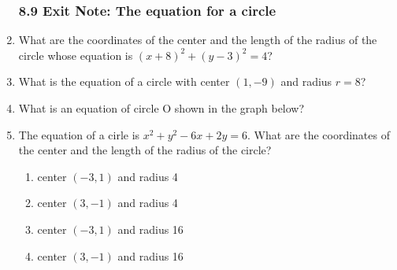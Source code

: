 \documentclass[12pt, twoside]{article}
\begin{document}
\begin{enumerate}
\newpage
\subsubsection*{8.9 Exit Note: The equation for a circle}
\item What are the coordinates of the center and the length of the radius of the circle whose equation is $(x+8)^2+(y-3)^2=4$? \vspace{1.5cm}

\item What is the equation of a circle with center $(1,-9)$ and radius $r=8$?\vspace{1.5cm}
  
\item What is an equation of circle O shown in the graph below?
  \begin{center}
  \end{center} \vspace{2cm}

\item %
The equation of a cirle is $x^2+y^2-6x+2y=6$. What are the coordinates of the center and the length of the radius of the circle?
  \begin{enumerate}
    \item center $(-3,1)$ and radius 4
    \item center $(3,-1)$ and radius 4
    \item center $(-3,1)$ and radius 16
    \item center $(3,-1)$ and radius 16
  \end{enumerate}

\end{enumerate}
\end{document}
